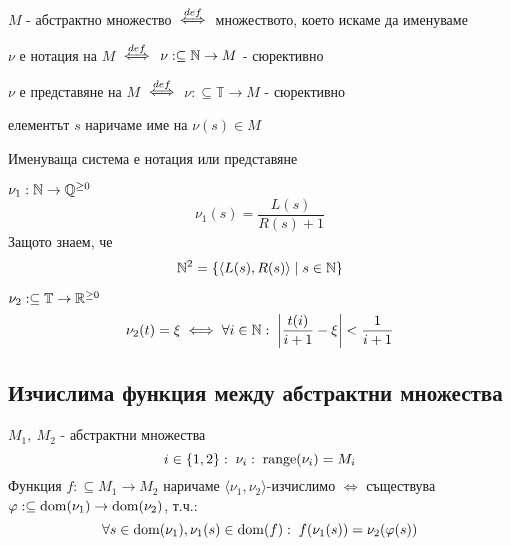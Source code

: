 \begin{notation}
    $M$ - абстрактно множество ${\overset{def}{\iff}}$ множеството, което искаме да именуваме
\end{notation}
\begin{definition}
     $\nu$ е нотация на $M$ ${\overset{def}{\iff}}$ $\nu: \subseteq {\mathbb{N}} \to M$ - сюрективно
\end{definition}
\begin{definition}
     $\nu$ е представяне на $M$ ${\overset{def}{\iff}}$ $\nu: \subseteq \mathbb T \to M$ - сюрективно
\end{definition}
\begin{notation}
    елементът $s$ наричаме име на $\nu(s) \in M$
\end{notation}
\begin{notation}
    Именуваща система е нотация или представяне
\end{notation}
\begin{example}
    $\nu_1: {\mathbb{N}} \to {\mathbb{Q}}^{\geq 0}$
    \begin{equation*}
        \nu_1(s) = \frac{L(s)}{R(s) + 1}
    \end{equation*}
    Защото знаем, че
    \begin{equation*}
        {\mathbb{N}}^2 = \left\{\langle L(s), R(s)\rangle\mid s \in {\mathbb{N}} \right\}
    \end{equation*}
\end{example}
\begin{example}
    $\nu_2: \subseteq \mathbb T \to {\mathbb{R}}^{\geq 0}$
    \begin{equation*}
        \nu_2(t) = \xi \iff \forall i\in{\mathbb{N}}:\;  \left|\frac{t(i)}{i+1} - \xi\right| < \frac{1}{i+1}
    \end{equation*}
\end{example}

\subsection{Изчислима функция между абстрактни множества}
\begin{definition}
    $M_1,\ M_2$ - абстрактни множества
    \begin{equation}
        i\in\{1, 2\}:\; \nu_i:\; \operatorname*{range}(\nu_i) = M_i
    \end{equation}
    Функция $f: \subseteq M_1 \to M_2$ наричаме $\langle \nu_1, \nu_2\rangle$-изчислимо $\iff$ съществува $\varphi: \subseteq \operatorname*{dom}(\nu_1) \to \operatorname*{dom}(\nu_2)$, т.ч.:
    \begin{equation}
        \forall s\in \operatorname*{dom}(\nu_1), \nu_1(s) \in \operatorname*{dom}(f):\; f(\nu_1(s)) = \nu_2(\varphi(s))
    \end{equation}
\end{definition}

